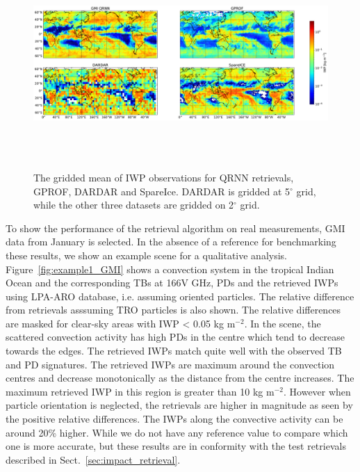 \documentclass[amt, manuscript]{copernicus}
\begin{document}
\begin{figure}[t]
	\includegraphics[width=16cm, height = 8cm]{Figures/IWP_spatial_distribution.pdf}
	\caption{ The gridded mean of IWP observations for QRNN retrievals, GPROF, DARDAR and SpareIce. DARDAR is gridded at 5$^\circ$ grid, while the other three datasets are gridded on 2$^\circ$ grid. }
	\label{fig:spatial_dist_GMI}
\end{figure}

To show the performance of the retrieval algorithm on real measurements, GMI data from January is selected. In the absence of a reference for benchmarking these results, we show an example scene for a qualitative analysis. Figure~\ref{fig:example1_GMI} shows a convection system in the tropical Indian Ocean and the corresponding TBs at 166V GHz, PDs and the retrieved IWPs using LPA-ARO database, i.e. assuming oriented particles. The relative difference from retrievals asssuming TRO particles is also shown. The relative differences are masked for clear-sky areas with IWP < 0.05 kg m$^{-2}$. In the scene, the scattered convection activity has high PDs in the centre which tend to decrease towards the edges. The retrieved IWPs match quite well with the observed TB and PD signatures. The retrieved IWPs are maximum around the convection centres and decrease monotonically as the distance from the centre increases. The maximum retrieved IWP in this region is greater than 10\,\,kg m$^{-2}$. However when particle orientation is neglected, the retrievals are higher in magnitude as seen by the positive relative differences. The IWPs along the convective activity can be around 20\% higher. While we do not have any reference value to compare which one is more accurate, but these results are in conformity with the test retrievals described in  Sect.~\ref{sec:impact_retrieval}.
\end{document}
